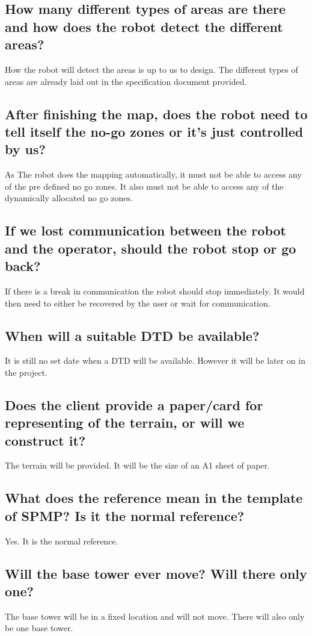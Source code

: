 \documentclass[a4paper]{article}
\begin{document}
\subsection{How many different types of areas are there and how does the robot detect the different areas?}
How the robot will detect the areas is up to us to design. The different types of areas are already laid out in the specification document provided.

\subsection{After finishing the map, does the robot need to tell itself the no-go zones or it’s just controlled by us?}
As The robot does the mapping automatically, it must not be able to access any of the pre defined no go zones. It also must not be able to access any of the dynamically allocated no go zones.

\subsection{If we lost communication between the robot and the operator, should the robot stop or go back?}

If there is a break in communication the robot should stop immediately. It would then need to either be recovered by the user or wait for communication.

\subsection{When will a suitable DTD be available?}
It is still no set date when a DTD will be available. However it will be later on in the project.

\subsection{Does the client provide a paper/card for representing of the terrain, or will we construct it?}
The terrain will be provided. It will be the size of an A1 sheet of paper.

\subsection{What does the reference mean in the template of SPMP? Is it the normal reference?}

Yes. It is the normal reference.

\subsection{Will the base tower ever move? Will there only one?}
The base tower will be in a fixed location and will not move. There will also only be one base tower.
\end{document}
